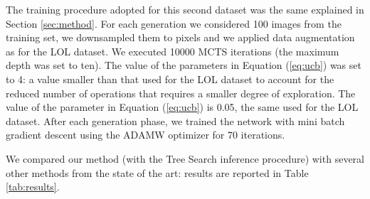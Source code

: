 \documentclass[3p,twocolumn]{elsarticle}
\begin{document}
The training procedure adopted for this second dataset was the same explained in Section \ref{sec:method}. For each generation we considered 100 images from the training set, we downsampled them to  pixels and we applied data augmentation as for the LOL dataset. We executed \num{10000} MCTS iterations (the maximum depth was set to ten).
The value of the parameters  in Equation (\ref{eq:ucb}) was set to 4: a value smaller than that used for the LOL dataset to account for the reduced number of operations that requires a smaller degree of exploration. The value of the parameter  in Equation (\ref{eq:ucb}) is 0.05, the same used for the LOL dataset.
After each generation phase, we trained the network with mini batch gradient descent using the ADAMW optimizer for 70 iterations. 

We compared our method (with the Tree Search inference procedure) with several other methods from the state of the art: results are reported in Table \ref{tab:results}.

\begin{table}[t]
    \caption{Comparison of state-of-the-art enhancement methods on the Adobe five-k dataset.}
    \label{tab:results}
\end{table}
\end{document}
